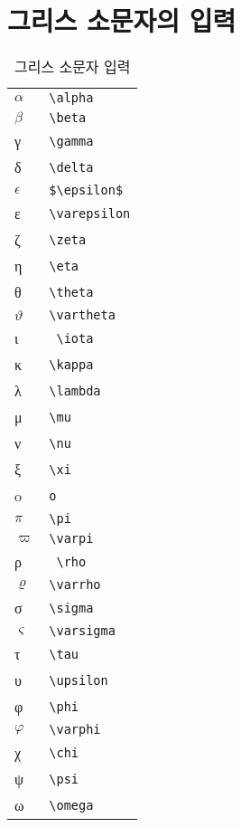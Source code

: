 \documentclass[12pt,a4paper]{report}
\begin{document}
\section{그리스 소문자의 입력}
	\begin{table}[hbp]
		\caption{그리스 소문자 입력}
		\centering
		\begin{tabular}{ l l }
		\toprule
		$\alpha$		&\verb|\alpha| \\
		$\beta$			&\verb|\beta|  \\ 
		γ 				&\verb|\gamma|  \\
		δ 				&\verb|\delta|  \\ 
		$\epsilon$		&\verb|$\epsilon$|  \\
		ε				&\verb|\varepsilon| \\
		ζ 				&\verb|\zeta| \\ 
		η 				&\verb|\eta|  \\
		θ 				&\verb|\theta| \\
		$\vartheta$ 	&\verb|\vartheta| \\
		ι				&\verb| \iota|  \\		 
		κ 				&\verb|\kappa| \\		
		λ				&\verb|\lambda| \\		
		μ				&\verb|\mu|	 \\		
		ν				&\verb|\nu|	 \\		
		ξ 				&\verb|\xi| \\			
		o				&\verb|o| \\		
		$\pi$			&\verb|\pi| \\		
		$\varpi$	 	&\verb|\varpi| \\	
		ρ				&\verb| \rho| \\	
		$\varrho$		&\verb|\varrho| \\	
		σ		&\verb|\sigma| \\	
		$\varsigma$	&\verb|\varsigma| \\
		τ		&\verb|\tau|  \\
		υ 	&\verb|\upsilon| \\
		φ		&\verb|\phi| \\
		$\varphi$	 	&\verb|\varphi| \\
		χ		&\verb|\chi| \\
		ψ		&\verb|\psi| \\
		ω		&\verb|\omega| \\
	    \bottomrule
		\end{tabular}%
	\end{table}%
\end{document}
